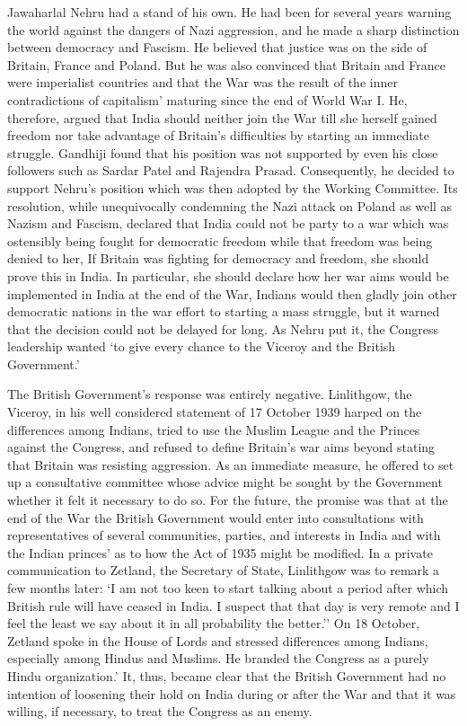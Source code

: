 Jawaharlal Nehru had a stand of his own. He had been for several years warning the world against the dangers of Nazi aggression, and he made a sharp distinction between democracy and Fascism. He believed that justice was on the side of Britain, France and Poland. But he was also convinced that Britain and France were imperialist countries and that the War was the result of the inner contradictions of capitalism' maturing since the end of World War I. He, therefore, argued that India should neither join the War till she herself gained freedom nor take advantage of Britain's difficulties by starting an immediate struggle. Gandhiji found that his position was not supported by even his close followers such as Sardar Patel and Rajendra Prasad. Consequently, he decided to support Nehru's position which was then adopted by the Working Committee. Its resolution, while unequivocally condemning the Nazi attack on Poland as well as Nazism and Fascism, declared that India could not be party to a war which was ostensibly being fought for democratic freedom while that freedom was being denied to her, If Britain was fighting for democracy and freedom, she should prove this in India. In particular, she should declare how her war aims would be implemented in India at the end of the War, Indians would then gladly join other democratic nations in the war effort to starting a mass struggle, but it warned that the decision could not be delayed for long. As Nehru put it, the Congress leadership wanted `to give every chance to the Viceroy and the British Government.' 

The British Government's response was entirely negative. Linlithgow, the Viceroy, in his well considered statement of 17 October 1939 harped on the differences among Indians, tried to use the Muslim League and the Princes against the Congress, and refused to define Britain's war aims beyond stating that Britain was resisting aggression. As an immediate measure, he offered to set up a consultative committee whose advice might be sought by the Government whether it felt it necessary to do so. For the future, the promise was that at the end of the War the British Government would enter into consultations with representatives of several communities, parties, and interests in India and with the Indian princes' as to how the Act of 1935 might be modified. In a private communication to Zetland, the Secretary of State, Linlithgow was to remark a few months later: `I am not too keen to start talking about a period after which British rule will have ceased in India. I suspect that that day is very remote and I feel the least we say about it in all probability the better.'' On 18 October, Zetland spoke in the House of Lords and stressed differences among Indians, especially among Hindus and Muslims. He branded the Congress as a purely Hindu organization.' It, thus, became clear that the British Government had no intention of loosening their hold on India during or after the War and that it was willing, if necessary, to treat the Congress as an enemy. 

